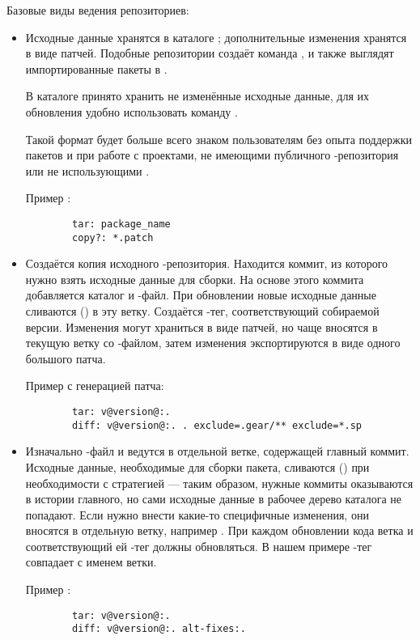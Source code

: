 Базовые виды ведения  репозиториев:
\begin{itemize}
	\item {}
	
	Исходные данные хранятся в каталоге ; дополнительные изменения хранятся в виде патчей.
		Подобные репозитории создаёт команда , и также выглядят импортированные
		пакеты в .
	
	В каталоге  принято хранить не изменённые исходные данные, для их обновления удобно
		использовать команду .
	
	Такой формат будет больше всего знаком пользователям без опыта поддержки пакетов 
		и при работе с проектами, не имеющими публичного -репозитория или не использующими .
	
	Пример :
\begin{verbatim}
        tar: package_name
        copy?: *.patch
\end{verbatim}
	
	\item {}
	
	Создаётся копия исходного -репозитория. Находится коммит, из которого нужно взять исходные
	данные для сборки. На основе этого коммита добавляется каталог  и -файл.
	При обновлении новые исходные данные сливаются () в эту ветку. Создаётся -тег,
	соответствующий собираемой версии. Изменения могут храниться в виде патчей, но чаще вносятся в
	текущую ветку со -файлом, затем изменения экспортируются в виде одного большого патча.
	
	Пример  с генерацией патча:
\begin{verbatim}
        tar: v@version@:.
        diff: v@version@:. . exclude=.gear/** exclude=*.sp
\end{verbatim}
	
	\item {}
	
	Изначально -файл и  ведутся в отдельной ветке, содержащей главный коммит.
		Исходные данные, необходимые для сборки пакета, сливаются () при необходимости
		с  стратегией  --- таким образом, нужные коммиты оказываются в истории
		главного, но сами исходные данные в рабочее дерево каталога не попадают. Если нужно внести
		какие-то специфичные изменения, они вносятся в отдельную ветку, например .
		При каждом обновлении кода ветка  и соответствующий ей -тег должны
		обновляться. В нашем примере -тег совпадает с именем ветки.
	
	Пример :
\begin{verbatim}
        tar: v@version@:.
        diff: v@version@:. alt-fixes:.
\end{verbatim}
\end{itemize}

